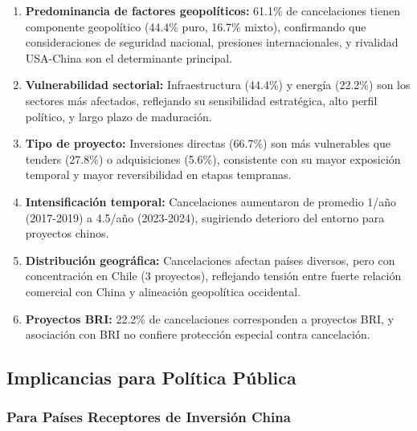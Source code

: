 \documentclass[12pt]{article}
\begin{document}
\begin{enumerate}
    \item \textbf{Predominancia de factores geopolíticos:} 61.1\% de cancelaciones tienen componente geopolítico (44.4\% puro, 16.7\% mixto), confirmando que consideraciones de seguridad nacional, presiones internacionales, y rivalidad USA-China son el determinante principal.
    
    \item \textbf{Vulnerabilidad sectorial:} Infraestructura (44.4\%) y energía (22.2\%) son los sectores más afectados, reflejando su sensibilidad estratégica, alto perfil político, y largo plazo de maduración.
    
    \item \textbf{Tipo de proyecto:} Inversiones directas (66.7\%) son más vulnerables que tenders (27.8\%) o adquisiciones (5.6\%), consistente con su mayor exposición temporal y mayor reversibilidad en etapas tempranas.
    
    \item \textbf{Intensificación temporal:} Cancelaciones aumentaron de promedio 1/año (2017-2019) a 4.5/año (2023-2024), sugiriendo deterioro del entorno para proyectos chinos.
    
    \item \textbf{Distribución geográfica:} Cancelaciones afectan países diversos, pero con concentración en Chile (3 proyectos), reflejando tensión entre fuerte relación comercial con China y alineación geopolítica occidental.
    
    \item \textbf{Proyectos BRI:} 22.2\% de cancelaciones corresponden a proyectos BRI, y asociación con BRI no confiere protección especial contra cancelación.
\end{enumerate}

\subsection{Implicancias para Política Pública}

\subsubsection{Para Países Receptores de Inversión China}
\end{document}
